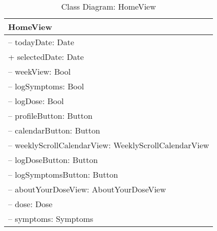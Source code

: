 \begin{table}[ht]
\centering
\caption{Class Diagram: HomeView}

\hspace{1em}
\renewcommand{\arraystretch}{1.7}

\begin{tabular}{|l|}
\hline
\textbf{HomeView} \\
\hline
– todayDate: Date \\
+ selectedDate: Date \\
– weekView: Bool \\
– logSymptoms: Bool \\
– logDose: Bool \\
– profileButton: Button \\
– calendarButton: Button \\
– weeklyScrollCalendarView: WeeklyScrollCalendarView \\
– logDoseButton: Button \\
– logSymptomsButton: Button \\
– aboutYourDoseView: AboutYourDoseView \\
– dose: Dose \\
– symptoms: Symptoms \\
\hline
\end{tabular}
\end{table}
